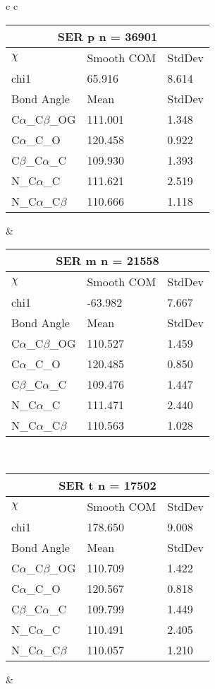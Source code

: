 \begin{longtable}{ c c }
  \begin{tabular}{ l l l }
  \toprule
  \multicolumn{3}{c}{SER \textbf{p} n = 36901} \\ \toprule
  $\chi$       & Smooth COM & StdDev \\ \midrule
  chi1 & 65.916 & 8.614 \\ \midrule
  Bond Angle   & Mean     & StdDev \\ \midrule
  C$\alpha$\_C$\beta$\_OG & 111.001 & 1.348\\
  C$\alpha$\_C\_O & 120.458 & 0.922\\
  C$\beta$\_C$\alpha$\_C & 109.930 & 1.393\\
  N\_C$\alpha$\_C & 111.621 & 2.519\\
  N\_C$\alpha$\_C$\beta$ & 110.666 & 1.118\\
  \bottomrule
  \end{tabular}
  &
  \begin{tabular}{ l l l }
  \toprule
  \multicolumn{3}{c}{SER \textbf{m} n = 21558} \\ \toprule
  $\chi$       & Smooth COM & StdDev \\ \midrule
  chi1 & -63.982 & 7.667 \\ \midrule
  Bond Angle   & Mean     & StdDev \\ \midrule
  C$\alpha$\_C$\beta$\_OG & 110.527 & 1.459\\
  C$\alpha$\_C\_O & 120.485 & 0.850\\
  C$\beta$\_C$\alpha$\_C & 109.476 & 1.447\\
  N\_C$\alpha$\_C & 111.471 & 2.440\\
  N\_C$\alpha$\_C$\beta$ & 110.563 & 1.028\\
  \bottomrule
  \end{tabular}
  \\
  \begin{tabular}{ l l l }
  \toprule
  \multicolumn{3}{c}{SER \textbf{t} n = 17502} \\ \toprule
  $\chi$       & Smooth COM & StdDev \\ \midrule
  chi1 & 178.650 & 9.008 \\ \midrule
  Bond Angle   & Mean     & StdDev \\ \midrule
  C$\alpha$\_C$\beta$\_OG & 110.709 & 1.422\\
  C$\alpha$\_C\_O & 120.567 & 0.818\\
  C$\beta$\_C$\alpha$\_C & 109.799 & 1.449\\
  N\_C$\alpha$\_C & 110.491 & 2.405\\
  N\_C$\alpha$\_C$\beta$ & 110.057 & 1.210\\
  \bottomrule
  \end{tabular}
  &
  \\
  
\end{longtable}    

